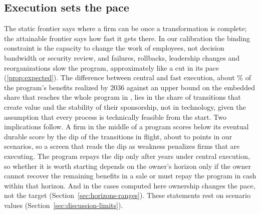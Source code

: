 \subsection{Execution sets the pace}
The static frontier says where a firm can be once a transformation is complete; the attainable frontier says how fast it gets there. In our calibration the binding constraint is the capacity to change the work of employees, not decision bandwidth or security review, and failures, rollbacks, leadership changes and reorganizations slow the program, approximately like a cut in its pace (\autoref{prop:expected}). The difference between central and fast execution, about \PaceCenSix\% of the program's benefits realized by 2036 against an upper bound on the embedded share that reaches the whole program in \PaceFastDone, lies in the share of transitions that create value and the stability of their sponsorship, not in technology, given the assumption that every process is technically feasible from the start. Two implications follow. A firm in the middle of a program scores below its eventual durable score by the dip of the transitions in flight, about \CenDipEight{} to \PaceDipFast{} points in our scenarios, so a screen that reads the dip as weakness penalizes firms that are executing. The program repays the dip only after \PayBackCen{} years under central execution, so whether it is worth starting depends on the owner's horizon only if the owner cannot recover the remaining benefits in a sale or must repay the program in cash within that horizon. And in the cases computed here ownership changes the pace, not the target (Section~\ref{sec:horizons-ranges}). These statements rest on scenario values (Section~\ref{sec:discussion-limits}).

